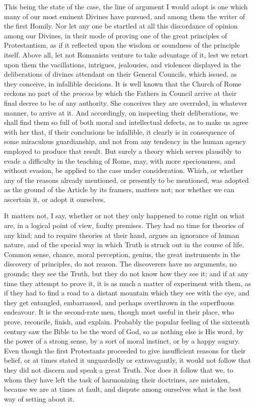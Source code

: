 This being the state of the case, the line of argument I would
adopt is one which many of our most eminent Divines have pursued, and
among them the writer of the first Homily. Nor let any one be startled
at all this discordance of opinion among our Divines, in their mode of
proving one of the great principles of Protestantism, as if it
reflected upon the wisdom or soundness of the principle itself. Above
all, let not Romanists venture to take advantage of it, lest we retort
upon them the vacillations, intrigues, jealousies, and violences
displayed in the deliberations of divines attendant on their General
Councils, which issued, as they conceive, in infallible decisions. It
is well known that the Church of Rome reckons no part of the \emph{process}
by which the Fathers in Council arrive at their final decree to be of
any authority. She conceives they are overruled, in whatever manner,
to arrive at it. And accordingly, on inspecting their deliberations,
we shall find them so full of both moral and intellectual defects, as
to make us agree with her that, if their conclusions be infallible, it
clearly is in consequence of some miraculous guardianship, and not
from any tendency in the human agency employed to produce that result.
But surely a theory which serves plausibly to evade a difficulty in
the teaching of Rome, may, with more speciousness, and without
evasion, be applied to the case under consideration. Which, or whether
any of the reasons already mentioned, or presently to be mentioned,
was adopted as the ground of the Article by its framers, matters not;
nor whether we can ascertain it, or adopt it ourselves.

It matters not, I say, whether or not they only happened to come
right on what are, in a logical point of view, faulty premises. They
had no time for theories of any kind; and to require theories at their
hand, argues an ignorance of human nature, and of the special way in
which Truth is struck out in the course of life. Common sense, chance,
moral perception, genius, the great instruments in the discovery of
principles, do not reason. The discoverers have no arguments, no
grounds; they see the Truth, but they do not know how they see it; and
if at any time they attempt to prove it, it is as much a matter of
experiment with them, as if they had to find a road to a distant
mountain which they see with the eye, and they get entangled,
embarrassed, and perhaps overthrown in the superfluous endeavour. It
is the second-rate men, though most useful in their place, who prove,
reconcile, finish, and explain. Probably the popular feeling of the
sixteenth century saw the Bible to be the word of God, so as nothing
else is His word, by the power of a strong sense, by a sort of moral
instinct, or by a happy augury. Even though the first
Protestants proceeded to give insufficient reasons for their belief,
or at times stated it unguardedly or extravagantly, it would not
follow that they did not discern and speak a great Truth. Nor does it
follow that we, to whom they have left the task of harmonizing their
doctrines, are mistaken, because we are at times at fault, and dispute
among ourselves what is the best way of setting about it.

